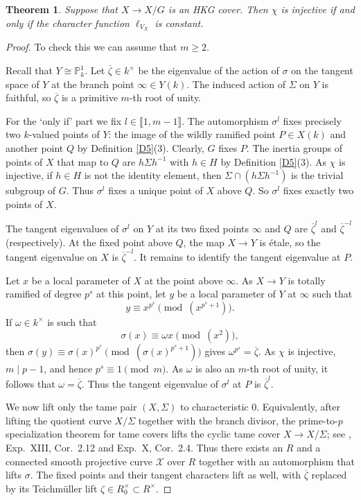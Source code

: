 \documentclass[11pt]{amsart}
\newtheorem{theorem}{Theorem}[section]
\begin{document}
\begin{theorem}\label{T5}
Suppose that $X\rightarrow X/G$ is an HKG cover. Then $\chi$ is injective if and only if the character function $\ell_{V_X}$ is constant.
\end{theorem}

\begin{proof}
To check this we can assume that $m\ge 2$.

Recall that $Y\cong\mathbb P_k^1$. Let $\overline{\zeta}\in k^\times$ be the eigenvalue of the action of $\sigma$ on the tangent space of $Y$ at the branch point $\infty\in Y(k)$. The induced action of $\Sigma$ on $Y$ is faithful, so $\overline{\zeta}$ is a primitive $m$-th root of unity.

For the `only if' part we fix $l\in\llbracket1,m-1\rrbracket$. The automorphism $\sigma^l$ fixes precisely two $k$-valued points of $Y$: the image of the wildly ramified point $P\in X(k)$ and another point $Q$ by Definition \ref{D5}(3). Clearly, $G$ fixes $P$. The inertia groups of points of $X$ that map to $Q$ are $h\Sigma h^{-1}$ with $h\in H$ by Definition \ref{D5}(3). As $\chi$ is injective, if $h\in H$ is not the identity element, then $\Sigma\cap (h\Sigma h^{-1})$ is the trivial subgroup of $G$. Thus $\sigma^l$ fixes a unique point of $X$ above $Q$. So $\sigma^l$ fixes exactly two points of $X$.

The tangent eigenvalues of $\sigma^l$ on $Y$ at its two fixed points $\infty$ and $Q$ are $\overline{\zeta}^l$ and $\overline{\zeta}^{-l}$ (respectively). At the fixed point above $Q$, the map $X\rightarrow Y$ is \'etale, so the tangent eigenvalue on $X$ is $\overline{\zeta}^{-l}$. It remains to identify the tangent eigenvalue at $P$. 

Let $x$ be a local parameter of $X$ at the point above $\infty$. As $X\rightarrow Y$ is totally ramified of degree $p^s$ at this point, let $y$ be a local parameter of $Y$ at $\infty$ such that
$$y\equiv x^{p^s}\pmod{(x^{p^s+1})}.$$
If $\omega\in k^{\times}$ is such that
$$\sigma(x)\equiv\omega x\pmod{(x^2)},$$
then $\sigma(y)\equiv \sigma(x)^{p^s}\pmod{(\sigma(x)^{p^s+1})}$ gives $\omega^{p^s}=\overline{\zeta}$. As $\chi$ is injective, $m\mid p-1$, and hence $p^s\equiv 1\pmod m$. As $\omega$ is also an $m$-th root of unity, it follows that $\omega=\overline{\zeta}$. Thus the tangent eigenvalue of $\sigma^l$ at $P$ is $\overline{\zeta}^l$.

We now lift only the tame pair $(X,\Sigma)$ to characteristic $0$. Equivalently, after lifting the quotient curve $X/\Sigma$ together with the branch divisor, the prime-to-$p$ specialization theorem for tame covers lifts the cyclic tame cover $X\rightarrow X/\Sigma$; see \cite{SGA 1}, Exp.\ XIII, Cor.\ 2.12 and Exp.\ X, Cor.\ 2.4. Thus there exists an $R$ and a connected smooth projective curve $\mathcal X$ over $R$ together with an automorphism that lifts $\sigma$. The fixed points and their tangent characters lift as well, with $\overline{\zeta}$ replaced by its Teichm\"uller lift $\zeta\in R_0^{\times}\subset R^\times$.


\end{proof}
\end{document}

